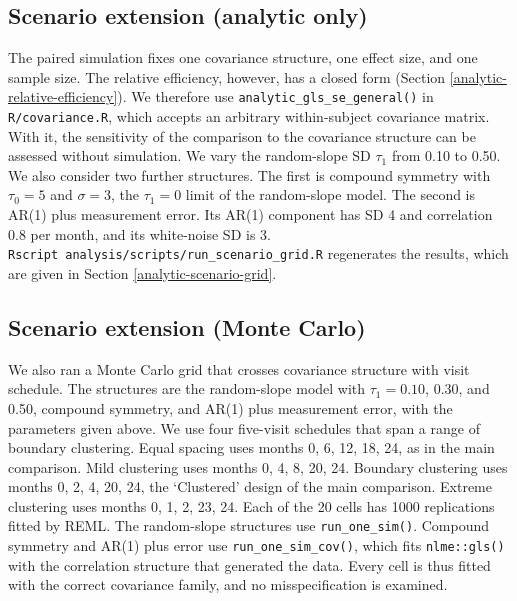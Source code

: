 \documentclass[
  11pt,
]{article}
\begin{document}
\subsection{Scenario extension (analytic only)}\label{scenario-extension-analytic-only}

The paired simulation fixes one covariance structure, one effect
size, and one sample size. The relative efficiency, however, has a
closed form (Section \ref{analytic-relative-efficiency}). We
therefore use \texttt{analytic\_gls\_se\_general()} in \texttt{R/covariance.R},
which accepts an arbitrary within-subject covariance matrix. With
it, the sensitivity of the comparison to the covariance structure
can be assessed without simulation. We vary the random-slope SD
\(\tau_1\) from 0.10 to 0.50. We also consider two further
structures. The first is compound symmetry with \(\tau_0 = 5\) and
\(\sigma = 3\), the \(\tau_1 = 0\) limit of the random-slope model.
The second is AR(1) plus measurement error. Its AR(1) component
has SD 4 and correlation 0.8 per month, and its white-noise SD
is 3. \texttt{Rscript\ analysis/scripts/run\_scenario\_grid.R} regenerates the
results, which are given in Section \ref{analytic-scenario-grid}.

\subsection{Scenario extension (Monte Carlo)}\label{scenario-extension-monte-carlo}

We also ran a Monte Carlo grid that crosses covariance structure
with visit schedule. The structures are the random-slope model
with \(\tau_1 = 0.10\), 0.30, and 0.50, compound symmetry, and AR(1)
plus measurement error, with the parameters given above. We use
four five-visit schedules that span a range of boundary
clustering. Equal spacing uses months 0, 6, 12, 18, 24, as in the
main comparison. Mild clustering uses months 0, 4, 8, 20, 24.
Boundary clustering uses months 0, 2, 4, 20, 24, the `Clustered'
design of the main comparison. Extreme clustering uses months 0,
1, 2, 23, 24. Each of the 20 cells has 1000
replications fitted by REML. The random-slope structures use
\texttt{run\_one\_sim()}. Compound symmetry and AR(1) plus error use
\texttt{run\_one\_sim\_cov()}, which fits \texttt{nlme::gls()} with the correlation
structure that generated the data. Every cell is thus fitted with
the correct covariance family, and no misspecification is
examined.
\end{document}
